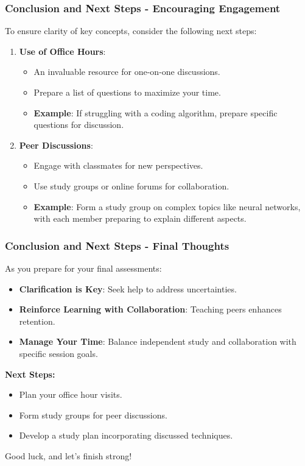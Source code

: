 \documentclass[aspectratio=169]{beamer}
\begin{document}
\begin{frame}[fragile]
  \frametitle{Conclusion and Next Steps - Encouraging Engagement}
  To ensure clarity of key concepts, consider the following next steps:
  \begin{enumerate}
      \item \textbf{Use of Office Hours}:
      \begin{itemize}
          \item An invaluable resource for one-on-one discussions.
          \item Prepare a list of questions to maximize your time.
          \item \textbf{Example}: If struggling with a coding algorithm, prepare specific questions for discussion.
      \end{itemize}
      \item \textbf{Peer Discussions}:
      \begin{itemize}
          \item Engage with classmates for new perspectives.
          \item Use study groups or online forums for collaboration.
          \item \textbf{Example}: Form a study group on complex topics like neural networks, with each member preparing to explain different aspects.
      \end{itemize}
  \end{enumerate}
\end{frame}

\begin{frame}[fragile]
  \frametitle{Conclusion and Next Steps - Final Thoughts}
  As you prepare for your final assessments:
  \begin{itemize}
      \item \textbf{Clarification is Key}: Seek help to address uncertainties.
      \item \textbf{Reinforce Learning with Collaboration}: Teaching peers enhances retention.
      \item \textbf{Manage Your Time}: Balance independent study and collaboration with specific session goals.
  \end{itemize}
  \textbf{Next Steps:}
  \begin{itemize}
      \item Plan your office hour visits.
      \item Form study groups for peer discussions.
      \item Develop a study plan incorporating discussed techniques.
  \end{itemize}
  Good luck, and let’s finish strong!
\end{frame}
\end{document}
